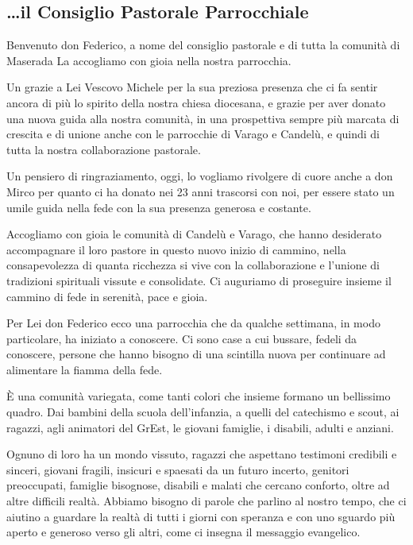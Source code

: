 \subsection{\dots il Consiglio Pastorale Parrocchiale}

Benvenuto don Federico,
a nome del consiglio pastorale e di tutta la comunità di Maserada La accogliamo con gioia nella nostra parrocchia.

Un grazie a Lei Vescovo Michele per la sua preziosa presenza che ci fa sentir ancora di più lo spirito della nostra chiesa diocesana, e grazie per aver donato una nuova guida alla nostra comunità, in una prospettiva sempre più marcata di crescita e di unione anche con le parrocchie di Varago e Candelù, e quindi di tutta la nostra collaborazione pastorale.

Un pensiero di ringraziamento, oggi, lo vogliamo rivolgere di cuore anche a don Mirco per quanto ci ha donato nei 23 anni trascorsi con noi, per essere stato un umile guida nella fede con la sua presenza generosa e costante.

Accogliamo con gioia le comunità di Candelù e Varago, che hanno desiderato accompagnare il loro pastore in questo nuovo inizio di cammino, nella consapevolezza di quanta ricchezza si vive con la collaborazione e l'unione di tradizioni spirituali vissute e consolidate. Ci auguriamo di proseguire insieme il cammino di fede in serenità, pace e gioia.

Per Lei don Federico ecco una parrocchia che da qualche settimana, in modo particolare, ha iniziato a conoscere. Ci sono case a cui bussare, fedeli da conoscere, persone che hanno bisogno di una scintilla nuova per continuare ad alimentare la fiamma della fede.

È una comunità variegata, come tanti colori che insieme formano un bellissimo quadro. Dai bambini della scuola dell'infanzia, a quelli del catechismo e scout, ai ragazzi, agli animatori del GrEst, le giovani famiglie, i disabili, adulti e anziani.

Ognuno di loro ha un mondo vissuto, ragazzi che aspettano testimoni credibili e sinceri, giovani fragili, insicuri e spaesati da un futuro incerto, genitori preoccupati, famiglie bisognose, disabili e malati che cercano conforto, oltre ad altre difficili realtà. Abbiamo bisogno di parole che parlino al nostro tempo, che ci aiutino a guardare la realtà di tutti i giorni con speranza e con uno sguardo più aperto e generoso verso gli altri, come ci insegna il messaggio evangelico.

